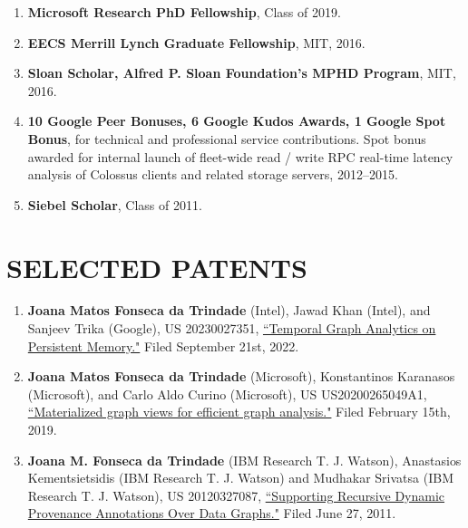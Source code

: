 \documentclass[centered,overlapped]{res}
\begin{document}
\begin{resume}
\begin{enumerate}
  \item \textbf{Microsoft Research PhD Fellowship}, Class of 2019.
  \item \textbf{EECS Merrill Lynch Graduate Fellowship}, MIT, 2016.
  \item \textbf{Sloan Scholar, Alfred P. Sloan Foundation's MPHD Program}, MIT, 2016.
  \item \textbf{10 Google Peer Bonuses, 6 Google Kudos Awards, 1 Google Spot Bonus}, for technical and professional service contributions.  Spot bonus awarded for internal launch of fleet-wide read / write RPC real-time latency analysis of Colossus clients and related storage servers, 2012--2015.
  \item \textbf{Siebel Scholar}, Class of 2011.
\end{enumerate}


\section{SELECTED PATENTS}
\begin{enumerate}
  \item \textbf{Joana Matos Fonseca da Trindade} (Intel), Jawad Khan (Intel), and Sanjeev Trika (Google), US 20230027351, \href{https://patents.justia.com/patent/20230027351}{``Temporal Graph Analytics on Persistent Memory."} Filed September 21st, 2022.
  \item \textbf{Joana Matos Fonseca da Trindade} (Microsoft), Konstantinos Karanasos (Microsoft), and Carlo Aldo Curino (Microsoft), US US20200265049A1, \href{https://patents.google.com/patent/US20200265049A1/en}{``Materialized graph views for efficient graph analysis."} Filed February 15th, 2019.
  \item \textbf{Joana M. Fonseca da Trindade} (IBM Research T. J. Watson), Anastasios Kementsietsidis (IBM Research T. J. Watson) and Mudhakar Srivatsa (IBM Research T. J. Watson), US 20120327087, \href{http://www.faqs.org/patents/app/20120327087}{``Supporting Recursive Dynamic Provenance Annotations Over Data Graphs."} Filed June 27, 2011.
\end{enumerate}


\end{resume}
\end{document}
